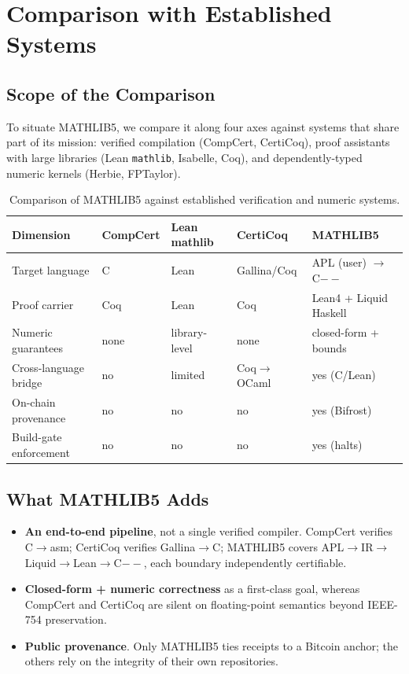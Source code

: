 \chapter{Comparison with Established Systems}
\label{ch:compare}

\section{Scope of the Comparison}
\label{sec:compare-scope}

To situate MATHLIB5, we compare it along four axes against systems that
share part of its mission: verified compilation (CompCert, CertiCoq),
proof assistants with large libraries (Lean \texttt{mathlib}, Isabelle,
Coq), and dependently-typed numeric kernels (Herbie, FPTaylor).

\begin{table}[ht]
\centering
\caption{Comparison of MATHLIB5 against established verification and
  numeric systems.}\label{tab:compare}
\small
\begin{tabular}{p{3.2cm} p{2.4cm} p{2.4cm} p{2.4cm} p{2.4cm}}
\toprule
\textbf{Dimension} & \textbf{CompCert} & \textbf{Lean mathlib} &
\textbf{CertiCoq} & \textbf{MATHLIB5} \\
\midrule
Target language & C & Lean & Gallina/Coq & APL (user) $\to$ C$--$ \\
Proof carrier & Coq & Lean & Coq & Lean4 + Liquid Haskell \\
Numeric guarantees & none & library-level & none & closed-form + bounds \\
Cross-language bridge & no & limited & Coq$\to$OCaml & yes (C/Lean) \\
On-chain provenance & no & no & no & yes (Bifrost) \\
Build-gate enforcement & no & no & no & yes (halts) \\
\bottomrule
\end{tabular}
\end{table}

\section{What MATHLIB5 Adds}
\label{sec:compare-add}

\begin{itemize}
  \item \textbf{An end-to-end pipeline}, not a single verified compiler.
        CompCert verifies C$\to$asm; CertiCoq verifies Gallina$\to$C;
        MATHLIB5 covers APL$\to$IR$\to$Liquid$\to$Lean$\to$C$--$, each
        boundary independently certifiable.
  \item \textbf{Closed-form + numeric correctness} as a first-class goal,
        whereas CompCert and CertiCoq are silent on floating-point
        semantics beyond IEEE-754 preservation.
  \item \textbf{Public provenance}. Only MATHLIB5 ties receipts to a
        Bitcoin anchor; the others rely on the integrity of their own
        repositories.
\end{itemize}

